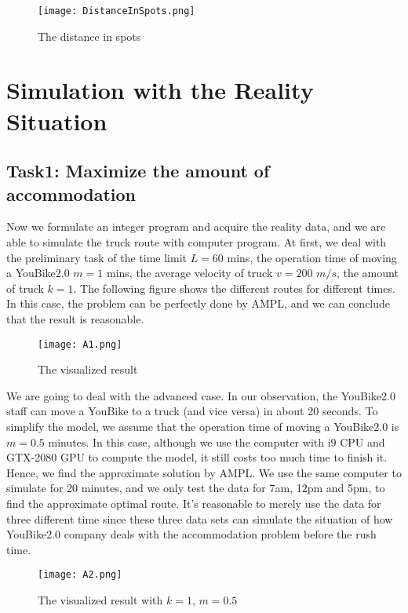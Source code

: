 \documentclass[12pt,a4paper]{article}
\begin{document}
\begin{figure}[htp]
    \centering
    \texttt{[image: DistanceInSpots.png]}
    \caption{The distance in spots}
    \label{fig:galaxy}
\end{figure}




\section{Simulation with the Reality Situation}
\subsection{Task1: Maximize the amount of accommodation}
Now we formulate an integer program and acquire the reality data, and we are able to simulate the truck route with computer program. At first, we deal with the preliminary task of the time limit $L = 60$ mins, the operation time of moving a YouBike2.0 $m = 1$ mins, the average velocity of truck $v=200$ $m/s$, the amount of truck $k=1$. The following figure shows the different routes for different times. In this case, the problem can be perfectly done by AMPL, and we can conclude that the result is reasonable.
\begin{figure}[htp]
    \centering
    \texttt{[image: A1.png]}
    \caption{The visualized result}
    \label{fig:galaxy}
\end{figure}

We are going to deal with the advanced case. In our observation, the YouBike2.0 staff can move a YouBike to a truck (and vice versa) in about 20  seconds. To simplify the model, we assume that the operation time of moving a YouBike2.0 is $m=0.5$ minutes. In this case, although we use the computer with i9 CPU and GTX-2080 GPU to compute the model, it still costs too much time to finish it. Hence, we find the approximate solution by AMPL. We use the same computer to simulate for 20 minutes, and we only test the data for 7am, 12pm and 5pm, to find the approximate optimal route. It's reasonable to merely use the data for three different time since these three data sets can simulate the situation of how YouBike2.0 company deals with the accommodation problem before the rush time.
\begin{figure}[htp]
    \centering
    \texttt{[image: A2.png]}
    \caption{The visualized result with $k=1$, $m=0.5$}
    \label{fig:galaxy}
\end{figure}
\end{document}
